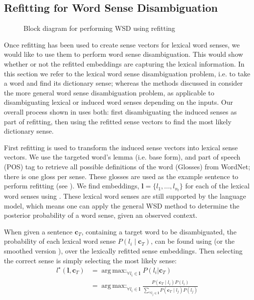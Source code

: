 \documentclass{article}
\renewcommand{\c}{\mathbf{c}}
\renewcommand{\l}{\mathbf{l}}
\DeclareMathOperator*{\argmax}{arg\,max:}
\begin{document}
\subsection{Refitting for Word Sense Disambiguation} 
\begin{figure}
	\begin{adjustbox}{max width=\columnwidth}
		
	\end{adjustbox}
	\caption{Block diagram for performing WSD using refitting \label{WSDBlock}} 
\end{figure}
Once refitting has been used to create sense vectors for lexical word senses, we would like to use them to perform word sense disambiguation.
This would show whether or not the refitted embeddings are capturing the lexical information.
In this section we refer to the lexical word sense disambiguation problem, i.e. to take a word and find its dictionary sense;
whereas the methods discussed in  consider the more general word sense disambiguation problem, as applicable to disambiguating lexical or induced word senses depending on the inputs.
Our overall process shown in  uses both: first disambiguating the induced senses as part of refitting, then using the refitted sense vectors to find the most likely dictionary sense.

First refitting is used to transform the induced sense vectors into lexical sense vectors.
We use the targeted word's lemma (i.e. base form), and part of speech (POS) tag to retrieve all possible definitions of the word (Glosses) from WordNet; there is one gloss per sense.
These glosses are used as the example sentence to perform refitting (see ).
We find embeddings, $\l=\{l_1,..., l_{n_l}\}$ for each of the lexical word senses using .
These lexical word senses are still supported by the language model, which means one can apply the general WSD method to determine the posterior probability of a word sense, given an observed context. 

When given a sentence $\c_{T}$, containing a target word to be disambiguated, 
the probability of each lexical word sense $P(l_i \mid \c_{T})$, can be found using  (or the smoothed version ), over the lexically refitted sense embeddings.
Then selecting the correct sense is simply selecting the most likely sense:
\begin{equation}
\begin{aligned}\label{eq:lexicalwsd}
l^\star (\l, \c_T) &= \argmax_{\forall l_i \in \l} P(l_i|\c_T) \\
&= \argmax_{\forall l_i \in \l} \frac{P(\c_T \mid l_i)P(l_i)}{\sum_{\forall l_j \in \l} P(\c_T \mid l_j)P(l_j)}
\end{aligned}
\end{equation}
\end{document}

